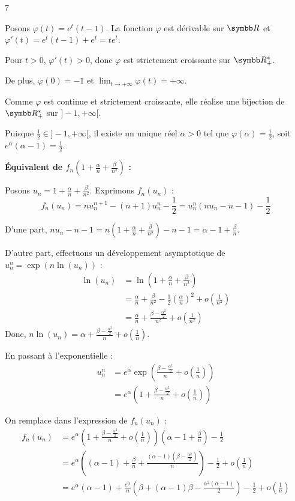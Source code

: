 \begin{correction}{7}
\begin{enumerate}
    Posons $\varphi(t) = e^t(t-1)$. La fonction $\varphi$ est dérivable sur $\R$ et $\varphi'(t) = e^t(t-1) + e^t = te^t$. 

    Pour $t > 0$, $\varphi'(t) > 0$, donc $\varphi$ est strictement croissante sur $\R_+^*$. 

    De plus, $\varphi(0) = -1$ et $\lim_{t \to +\infty} \varphi(t) = +\infty$. 

    Comme $\varphi$ est continue et strictement croissante, elle réalise une bijection de $\R_+^*$ sur $]-1, +\infty[$. 

    Puisque $\frac{1}{2} \in ]-1, +\infty[$, il existe un unique réel $\alpha > 0$ tel que $\varphi(\alpha) = \frac{1}{2}$, soit $e^\alpha(\alpha - 1) = \frac{1}{2}$.


    \textbf{Équivalent de $f_n\left(1 + \frac{\alpha}{n} + \frac{\beta}{n^2}\right)$ :}

    Posons $u_n = 1 + \frac{\alpha}{n} + \frac{\beta}{n^2}$. Exprimons $f_n(u_n)$ :
    \[f_n(u_n) = n u_n^{n+1} - (n+1)u_n^n - \frac{1}{2} = u_n^n (nu_n - n - 1) - \frac{1}{2}\]

    D'une part, $nu_n - n - 1 = n\left(1 + \frac{\alpha}{n} + \frac{\beta}{n^2}\right) - n - 1 = \alpha - 1 + \frac{\beta}{n}$.
    
    D'autre part, effectuons un développement asymptotique de $u_n^n = \exp(n \ln(u_n))$ :
    \begin{align*}
        \ln(u_n) &= \ln\left(1 + \frac{\alpha}{n} + \frac{\beta}{n^2}\right) \\
        &= \frac{\alpha}{n} + \frac{\beta}{n^2} - \frac{1}{2}\left(\frac{\alpha}{n}\right)^2 + o\left(\frac{1}{n^2}\right) \\
        &= \frac{\alpha}{n} + \frac{\beta - \frac{\alpha^2}{2}}{n^2} + o\left(\frac{1}{n^2}\right)
    \end{align*}
    Donc, $n \ln(u_n) = \alpha + \frac{\beta - \frac{\alpha^2}{2}}{n} + o\left(\frac{1}{n}\right)$.

    En passant à l'exponentielle :
    \begin{align*}
        u_n^n &= e^\alpha \exp\left(\frac{\beta - \frac{\alpha^2}{2}}{n} + o\left(\frac{1}{n}\right)\right) \\
        &= e^\alpha \left( 1 + \frac{\beta - \frac{\alpha^2}{2}}{n} + o\left(\frac{1}{n}\right) \right)
    \end{align*}
    
    On remplace dans l'expression de $f_n(u_n)$ :
    \begin{align*}
        f_n(u_n) &= e^\alpha \left( 1 + \frac{\beta - \frac{\alpha^2}{2}}{n} + o\left(\frac{1}{n}\right) \right) \left( \alpha - 1 + \frac{\beta}{n} \right) - \frac{1}{2} \\
        &= e^\alpha \left( (\alpha - 1) + \frac{\beta}{n} + \frac{(\alpha - 1)\left(\beta - \frac{\alpha^2}{2}\right)}{n} \right) - \frac{1}{2} + o\left(\frac{1}{n}\right) \\
        &= e^\alpha (\alpha - 1) + \frac{e^\alpha}{n} \left( \beta + (\alpha - 1)\beta - \frac{\alpha^2(\alpha - 1)}{2} \right) - \frac{1}{2} + o\left(\frac{1}{n}\right)
    \end{align*}


\end{enumerate}
\end{correction}
